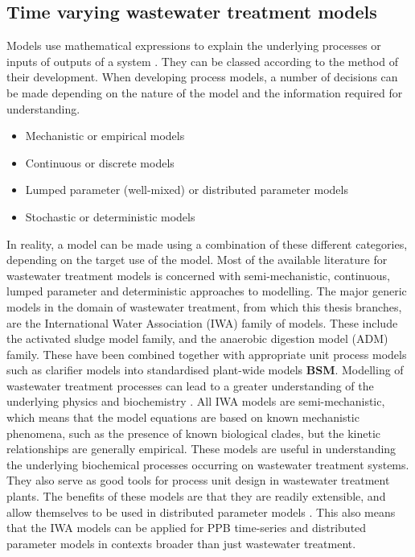 \subsection{Time varying wastewater treatment models}
\label{ssec:chap1-wwtmod}
Models use mathematical expressions to explain the underlying processes or inputs of outputs of a system \cite{hangos2001}. They can be classed according to the method of their development. When developing process models, a number of decisions can be made depending on the nature of the model and the information required for understanding.
\begin{itemize}
    \item Mechanistic or empirical models
    \item Continuous or discrete models
    \item Lumped parameter (well-mixed) or distributed parameter models
    \item Stochastic or deterministic models
\end{itemize}

In reality, a model can be made using a combination of these different categories, depending on the target use of the model. Most of the available literature for wastewater treatment models is concerned with semi-mechanistic, continuous, lumped parameter and deterministic approaches to modelling. The major generic models in the domain of wastewater treatment, from which this thesis branches, are the International Water Association (IWA) family of models. These include the activated sludge model family, and the anaerobic digestion model (ADM) \cite{batstone2006} family. These have been combined together with appropriate unit process models such as clarifier models \cite{takacs1991} into standardised plant-wide models \textbf{BSM}. Modelling of wastewater treatment processes can lead to a greater understanding of the underlying physics and biochemistry \cite{szilvester2010}. All IWA models are semi-mechanistic, which means that the model equations are based on known mechanistic phenomena, such as the presence of known biological clades, but the kinetic relationships are generally empirical.
\skippingparagraph
These models are useful in understanding the underlying biochemical processes occurring on wastewater treatment systems. They also serve as good tools for process unit design in wastewater treatment plants. The benefits of these models are that they are readily extensible, and allow themselves to be used in distributed parameter models \cite{batstone2006a}. This also means that the IWA models can be applied for PPB time-series and distributed parameter models in contexts broader than just wastewater treatment. 
